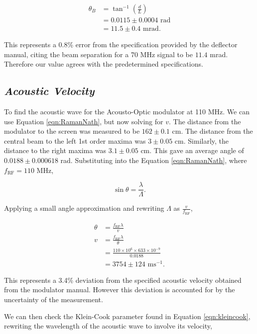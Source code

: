 \documentclass[aps,prl,reprint,10pt,amsmath,amssymb,superscriptaddress,a4paper]{revtex4-2}
\begin{document}
\begin{align*}
    \theta_B &= \tan^{-1}\left(\frac{d}{L}\right) \\
    &= 0.0115 \pm 0.0004\text{ rad} \\
    &= 11.5 \pm 0.4 \text{ mrad}.
\end{align*}

This represents a 0.8\% error from the specification provided by the deflector manual, citing the beam separation for a 70 MHz signal to be $11.4$ mrad. 
Therefore our value agrees with the predetermined specifications.

\subsection{\normalfont\textit{Acoustic Velocity}}

To find the acoustic wave for the Acousto-Optic modulator at 110 MHz. We can use Equation \ref{eqn:RamanNath}, but now solving for $v$. The distance from the 
modulator to the screen was measured to be $162 \pm 0.1$ cm. The distance from the central beam to the left 1st order maxima was $3 \pm 0.05$ cm. Similarly, 
the distance to the right maxima was $3.1 \pm 0.05$ cm. This gave an average angle of $0.0188 \pm 0.000618$ rad. Substituting into the Equation \ref{eqn:RamanNath},
where $f_{\text{RF}} = 110 \text{ MHz}$,

\begin{equation*}
    \sin{\theta} = \frac{\lambda}{\Lambda}.
\end{equation*}

Applying a small angle approximation and rewriting $\Lambda$ as $\frac{v}{f_{\text{RF}}}$,

\begin{align*}
    \theta &= \frac{f_{\text{RF}}\lambda}{v} \\
    v &= \frac{f_{\text{RF}}\lambda}{\theta} \\
    &= \frac{110 \times 10^6 \times 633 \times 10^{-9}}{0.0188} \\
    &= 3754 \pm 124 \text{ ms}^{-1}.
\end{align*}

This represents a 3.4\% deviation from the specified acoustic velocity obtained from the modulator manual. However this deviation 
is accounted for by the uncertainty of the measurement.

We can then check the Klein-Cook parameter found in Equation \ref{eqn:kleincook}, rewriting the wavelength of the acoustic wave to 
involve its velocity,
\end{document}
